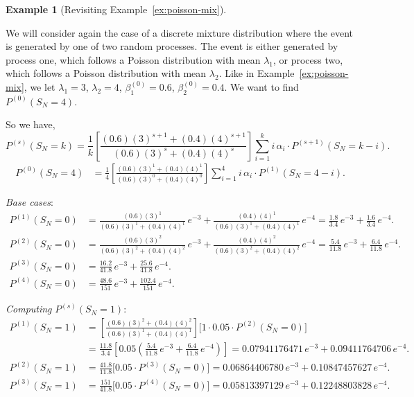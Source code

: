\documentclass[11pt]{amsart}
\theoremstyle{definition}
\newtheorem{example}{Example}
\theoremstyle{plain}
\begin{document}
\begin{example}[Revisiting Example~\ref{ex:poisson-mix}]\label{ex:revisit-mix}
We will consider again the case of a discrete mixture distribution where the event is
generated by one of two random processes.  The event is either generated by process one,
which follows a Poisson distribution with mean $\lambda_1$, or process two, which follows
a Poisson distribution with mean $\lambda_2$.  Like in Example~\ref{ex:poisson-mix}, we
let $\lambda_1 = 3$, $\lambda_2 = 4$, $\beta_1^{(0)} = 0.6$, $\beta_2^{(0)} = 0.4$.  We
want to find $P^{(0)}(S_N = 4)$.

So we have,
\[
    P^{(s)}(S_N = k)
    = \frac{1}{k}
      \left[
        \frac{(0.6)(3)^{s+1} + (0.4)(4)^{s+1}}
             {(0.6)(3)^s    + (0.4)(4)^s}
      \right]
      \sum_{i=1}^{k} i\,\alpha_i \cdot P^{(s+1)}(S_N = k - i).
\]
\begin{align*}
P^{(0)}(S_N = 4)
    &= \frac{1}{4}
       \left[\frac{(0.6)(3)^1 + (0.4)(4)^1}{(0.6)(3)^0 + (0.4)(4)^0}\right]
       \sum_{i=1}^{4} i\,\alpha_i \cdot P^{(1)}(S_N = 4 - i).
\end{align*}

\noindent\textit{Base cases}:
\begin{align*}
P^{(1)}(S_N = 0)
    &= \frac{(0.6)(3)^1}{(0.6)(3)^1 + (0.4)(4)^1}\,e^{-3}
     + \frac{(0.4)(4)^1}{(0.6)(3)^1 + (0.4)(4)^1}\,e^{-4}
     = \frac{1.8}{3.4}\,e^{-3} + \frac{1.6}{3.4}\,e^{-4}. \\
P^{(2)}(S_N = 0)
    &= \frac{(0.6)(3)^2}{(0.6)(3)^2 + (0.4)(4)^2}\,e^{-3}
     + \frac{(0.4)(4)^2}{(0.6)(3)^2 + (0.4)(4)^2}\,e^{-4}
     = \frac{5.4}{11.8}\,e^{-3} + \frac{6.4}{11.8}\,e^{-4}. \\
P^{(3)}(S_N = 0)
    &= \frac{16.2}{41.8}\,e^{-3} + \frac{25.6}{41.8}\,e^{-4}. \\
P^{(4)}(S_N = 0)
    &= \frac{48.6}{151}\,e^{-3} + \frac{102.4}{151}\,e^{-4}.
\end{align*}

\noindent\textit{Computing} $P^{(s)}(S_N = 1)$:
\begin{align*}
P^{(1)}(S_N = 1)
    &= \left[\frac{(0.6)(3)^2 + (0.4)(4)^2}{(0.6)(3)^1 + (0.4)(4)^1}\right]
       \bigl[1 \cdot 0.05 \cdot P^{(2)}(S_N = 0)\bigr] \\
    &= \frac{11.8}{3.4}\left[0.05\!\left(\frac{5.4}{11.8}\,e^{-3}
       + \frac{6.4}{11.8}\,e^{-4}\right)\right]
     = 0.07941176471\,e^{-3} + 0.09411764706\,e^{-4}. \\
P^{(2)}(S_N = 1)
    &= \frac{41.8}{11.8}\bigl[0.05 \cdot P^{(3)}(S_N = 0)\bigr]
     = 0.06864406780\,e^{-3} + 0.10847457627\,e^{-4}. \\
P^{(3)}(S_N = 1)
    &= \frac{151}{41.8}\bigl[0.05 \cdot P^{(4)}(S_N = 0)\bigr]
     = 0.05813397129\,e^{-3} + 0.12248803828\,e^{-4}.
\end{align*}


\end{example}
\end{document}
